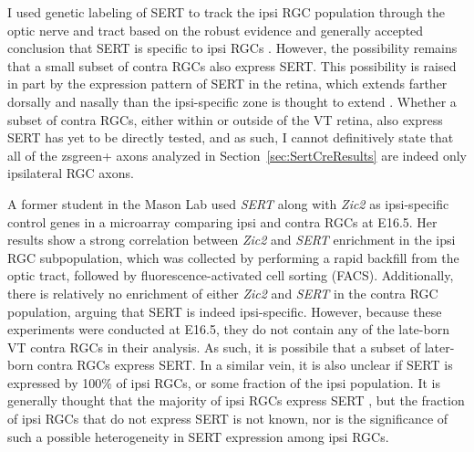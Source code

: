 \label{sec:TechnicalSERT}
I used genetic labeling of SERT to track the ipsi RGC population through the optic nerve and tract based on the robust evidence and generally accepted conclusion that SERT is specific to ipsi RGCs \cite{garcia2010zic2,koch2011pathway,upton1999excess}.
However, the possibility remains that a small subset of contra RGCs also express SERT.
This possibility is raised in part by the expression pattern of SERT in the retina, which extends farther dorsally and nasally than the ipsi-specific zone is thought to extend \cite{upton1999excess}.
Whether a subset of contra RGCs, either within or outside of the VT retina, also express SERT has yet to be directly tested, and as such, I cannot definitively state that all of the zsgreen+ axons analyzed in Section~\ref{sec:SertCreResults} are indeed only ipsilateral RGC axons.

A former student in the Mason Lab used \emph{SERT} along with \emph{Zic2} as ipsi-specific control genes in a microarray comparing ipsi and contra RGCs at E16.5. %
Her results show a strong correlation between \emph{Zic2} and \emph{SERT} enrichment in the ipsi RGC subpopulation, which was collected by performing a rapid backfill from the optic tract, followed by fluorescence-activated cell sorting (FACS). %
Additionally, there is relatively no enrichment of either \emph{Zic2} and \emph{SERT} in the contra RGC population, arguing that SERT is indeed ipsi-specific.
However, because these experiments were conducted at E16.5, they do not contain any of the late-born VT contra RGCs in their analysis.
As such, it is possibile that a subset of later-born contra RGCs express SERT.
In a similar vein, it is also unclear if SERT is expressed by 100\% of ipsi RGCs, or some fraction of the ipsi population.
It is generally thought that the majority of ipsi RGCs express SERT \cite{garcia2010zic2,koch2011pathway}, but the fraction of ipsi RGCs that do not express SERT is not known, nor is the significance of such a possible heterogeneity in SERT expression among ipsi RGCs.

